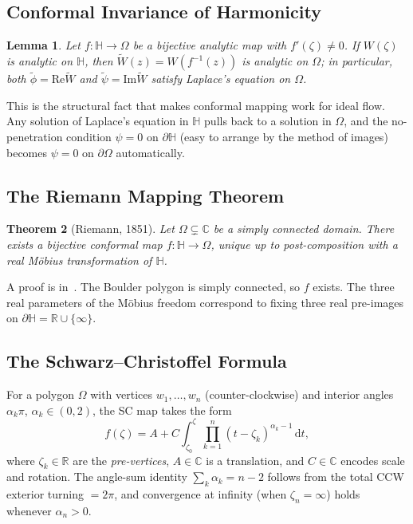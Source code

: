 \documentclass[11pt]{article}
\newcommand{\HH}{\mathbb{H}}
\newcommand{\CC}{\mathbb{C}}
\newcommand{\RR}{\mathbb{R}}
\newcommand{\dif}{\,\mathrm{d}}
\newcommand{\Imag}{\mathrm{Im}}
\newcommand{\Real}{\mathrm{Re}}
\newtheorem{theorem}{Theorem}
\newtheorem{lemma}[theorem]{Lemma}
\begin{document}
\subsection{Conformal Invariance of Harmonicity}
\label{sec:conformal}

\begin{lemma}
\label{lem:conformal}
Let $f : \HH \to \Omega$ be a bijective analytic map with $f'(\zeta) \neq 0$.
If $W(\zeta)$ is analytic on $\HH$, then $\tilde{W}(z) = W(f^{-1}(z))$ is
analytic on $\Omega$; in particular, both $\tilde{\phi} = \Real \tilde{W}$
and $\tilde{\psi} = \Imag \tilde{W}$ satisfy Laplace's equation on $\Omega$.
\end{lemma}

This is the structural fact that makes conformal mapping work for ideal flow.
Any solution of Laplace's equation in $\HH$ pulls back to a solution in
$\Omega$, and the no-penetration condition $\psi = 0$ on $\partial \HH$
(easy to arrange by the method of images) becomes $\psi = 0$ on
$\partial \Omega$ automatically.

\subsection{The Riemann Mapping Theorem}

\begin{theorem}[Riemann, 1851]
\label{thm:riemann}
Let $\Omega \subsetneq \CC$ be a simply connected domain. There exists a
bijective conformal map $f : \HH \to \Omega$, unique up to post-composition
with a real M\"obius transformation of $\HH$.
\end{theorem}

A proof is in~\citet[Ch.~6]{Ahlfors79}. The Boulder polygon is simply connected, so $f$ exists. The three real
parameters of the M\"obius freedom correspond to fixing three real pre-images
on $\partial \HH = \RR \cup \{\infty\}$.

\subsection{The Schwarz--Christoffel Formula}
\label{sec:sc-formula}

For a polygon $\Omega$ with vertices $w_1, \dots, w_n$ (counter-clockwise) and
interior angles $\alpha_k \pi$, $\alpha_k \in (0, 2)$, the SC map takes the
form~\citep[Ch.~V, \S6]{Nehari52}\citep[Ch.~6, \S2.2]{Ahlfors79}\citep[Ch.~2]{DT02}
\begin{equation}
  f(\zeta) = A + C \int_{\zeta_0}^{\zeta}
    \prod_{k=1}^{n} (t - \zeta_k)^{\alpha_k - 1} \dif t,
  \label{eq:SC}
\end{equation}
where $\zeta_k \in \RR$ are the \emph{pre-vertices}, $A \in \CC$ is a
translation, and $C \in \CC$ encodes scale and rotation. The angle-sum
identity $\sum_k \alpha_k = n - 2$ follows from the total CCW exterior turning
$= 2\pi$, and convergence at infinity (when $\zeta_n = \infty$) holds whenever
$\alpha_n > 0$.
\end{document}
